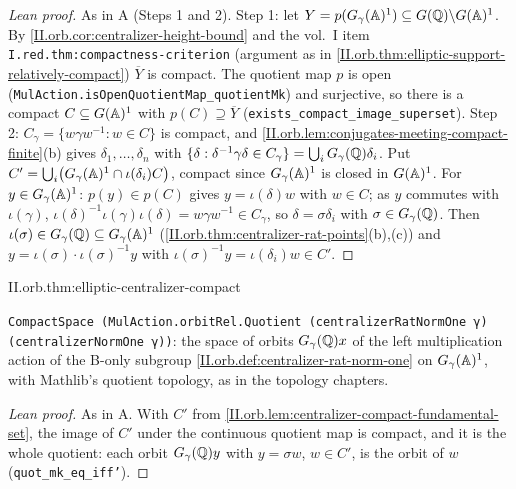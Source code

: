 \begin{proof}[Lean proof]
As in A (Steps 1 and 2). Step 1: let $Y=p(G_\gamma(\mathbb{A})^1)\subseteq G(\mathbb{Q})\backslash G(\mathbb{A})^1$. By \cref{II.orb.cor:centralizer-height-bound} and the vol.~I item \texttt{I.red.thm:compactness-criterion} (argument as in \cref{II.orb.thm:elliptic-support-relatively-compact}) $\overline Y$ is compact. The quotient map $p$ is open (\texttt{MulAction.isOpenQuotientMap\_quotientMk}) and surjective, so there is a compact $C\subseteq G(\mathbb{A})^1$ with $p(C)\supseteq\overline Y$ (\texttt{exists\_compact\_image\_superset}). Step 2: $C_\gamma=\{w\gamma w^{-1}:w\in C\}$ is compact, and \cref{II.orb.lem:conjugates-meeting-compact-finite}(b) gives $\delta_1,\dots,\delta_n$ with $\{\delta:\delta^{-1}\gamma\delta\in C_\gamma\}=\bigcup_iG_\gamma(\mathbb{Q})\delta_i$. Put $C'=\bigcup_i\bigl(G_\gamma(\mathbb{A})^1\cap\iota(\delta_i)C\bigr)$, compact since $G_\gamma(\mathbb{A})^1$ is closed in $G(\mathbb{A})^1$. For $y\in G_\gamma(\mathbb{A})^1$: $p(y)\in p(C)$ gives $y=\iota(\delta)w$ with $w\in C$; as $y$ commutes with $\iota(\gamma)$, $\iota(\delta)^{-1}\iota(\gamma)\iota(\delta)=w\gamma w^{-1}\in C_\gamma$, so $\delta=\sigma\delta_i$ with $\sigma\in G_\gamma(\mathbb{Q})$. Then $\iota(\sigma)\in G_\gamma(\mathbb{Q})\subseteq G_\gamma(\mathbb{A})^1$ (\cref{II.orb.thm:centralizer-rat-points}(b),(c)) and $y=\iota(\sigma)\cdot\iota(\sigma)^{-1}y$ with $\iota(\sigma)^{-1}y=\iota(\delta_i)w\in C'$.
\end{proof}

\begin{theorem}
\end{theorem}
\begin{tfformal}{II.orb.thm:elliptic-centralizer-compact}
\begin{tffidelity}
\texttt{CompactSpace (MulAction.orbitRel.Quotient (centralizerRatNormOne γ) (centralizerNormOne γ))}: the space of orbits $G_\gamma(\mathbb{Q})x$ of the left multiplication action of the B-only subgroup \cref{II.orb.def:centralizer-rat-norm-one} on $G_\gamma(\mathbb{A})^1$, with Mathlib's quotient topology, as in the topology chapters.
\end{tffidelity}
\end{tfformal}
\begin{proof}[Lean proof]
As in A. With $C'$ from \cref{II.orb.lem:centralizer-compact-fundamental-set}, the image of $C'$ under the continuous quotient map is compact, and it is the whole quotient: each orbit $G_\gamma(\mathbb{Q})y$ with $y=\sigma w$, $w\in C'$, is the orbit of $w$ (\texttt{quot\_mk\_eq\_iff'}).
\end{proof}
